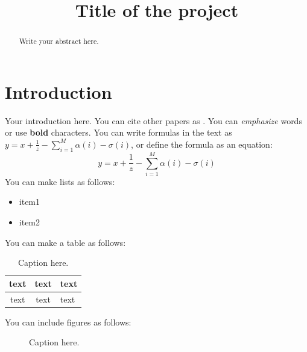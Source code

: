 \documentclass{article}
\title{Title of the project}
\begin{document}
%
\maketitle
%
\begin{abstract}
Write your abstract here.
\end{abstract}


\section{Introduction}
\label{sec:intro}
Your introduction here.
You can cite other papers as \cite{ref1}.
You can \emph{emphasize} words or use \textbf{bold} characters.
You can write formulas in the text as $y = x + \frac{1}{z} - \sum_{i=1}^M \alpha(i) - \sigma(i)$, or define the formula as an equation:
\begin{equation}\label{eq:myEquation}
y = x + \frac{1}{z} - \sum_{i=1}^M \alpha(i) - \sigma(i)
\end{equation}
You can make lists as follows:
\begin{itemize}
\item item1
\item item2
\end{itemize}

You can make a table as follows:

\begin{table}[h]
\caption{\small{Caption here.}}
\label{tab:parameters}
\centering
\begin{tabular}{c | c | l}
text & text & text\\
\hline \hline
text & text & text
\end{tabular}
\end{table}

You can include figures as follows:

\begin{figure}[h]
\centering
{}
\caption{Caption here. \label{figure:patterns}}
\end{figure}
\end{document}
